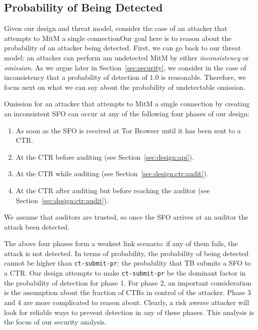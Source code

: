\subsection{Probability of Being Detected} \label{sec:risk:probability}
Given our design and threat model, consider the case of an attacker that
attempts to MitM a single connectionOur goal here is to reason about the
probability of an attacker being detected. First, we can go back to our threat
model: an attacker can perform am undetected MitM by either \emph{inconsistency}
or \emph{omission}. As we argue later in Section~\ref{sec:security}, we consider
in the case of inconsistency that a probability of detection of $1.0$ is
reasonable. Therefore, we focus next on what we can say about the probability of
undetectable omission.

Omission for an attacker that attempts to MitM a single connection by creating
an inconsistent SFO can occur at any of the following four phases of our design:
\begin{enumerate}
    \item As soon as the SFO is received at Tor Browser until it has been sent
    to a CTR.
    \item At the CTR before auditing (see Section~\ref{sec:design:api}).
    \item At the CTR while auditing (see Section~\ref{sec:design:ctr:audit}).
    \item At the CTR after auditing but before reaching the auditor (see
    Section~\ref{sec:design:ctr:audit}).
\end{enumerate}

We assume that auditors are trusted, so once the SFO arrives at an auditor the
attack been detected. 

The above four phases form a weakest link scenario: if any of them fails, the
attack is not detected. In terms of probability, the probability of being
detected cannot be higher than \texttt{ct-submit-pr}; the probability that TB
submits a SFO to a CTR. Our design attempts to make \texttt{ct-submit-pr} be the
dominant factor in the probability of detection for phase 1. For phase 2, an
important consideration is the assumption about the fraction of CTRs in control
of the attacker. Phase 3 and 4 are more complicated to reason about. Clearly, a
risk awerse attacker will look for reliable ways to prevent detection in any of
these phases. This analysis is the focus of our security analysis.